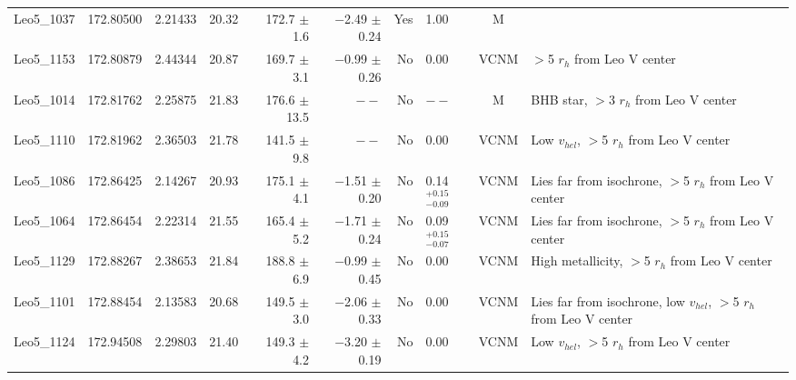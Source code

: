 \begin{table*}[t]
\begin{tabular}{lllrrrrlcl}
Leo5\_1037 & 172.80500 & 2.21433 & 20.32 & 172.7  $\pm$ 1.6 & $-$2.49  $\pm$ 0.24 & Yes & 1.00 & M & \\ 
Leo5\_1153 & 172.80879 & 2.44344 & 20.87 & 169.7  $\pm$ 3.1 & $-$0.99  $\pm$ 0.26 & No & 0.00 & VCNM & $>$5 $r_h$ from Leo V center\\ 
Leo5\_1014 & 172.81762 & 2.25875 & 21.83 & 176.6  $\pm$ 13.5 & $--$ & No &  $--$  & M & BHB star, $>$3 $r_h$ from Leo V center\\ 
Leo5\_1110 & 172.81962 & 2.36503 & 21.78 & 141.5  $\pm$ 9.8 & $--$ & No & 0.00 & VCNM & Low $v_{hel}$, $>$5 $r_h$ from Leo V center\\ 
Leo5\_1086 & 172.86425 & 2.14267 & 20.93 & 175.1  $\pm$ 4.1 & $-$1.51  $\pm$ 0.20 & No & 0.14$^{+0.15}_{-0.09}$ & VCNM & Lies far from isochrone, $>$5 $r_h$ from Leo V center\\ 
Leo5\_1064 & 172.86454 & 2.22314 & 21.55 & 165.4  $\pm$ 5.2 & $-$1.71  $\pm$ 0.24 & No & 0.09$^{+0.15}_{-0.07}$ & VCNM & Lies far from isochrone, $>$5 $r_h$ from Leo V center\\ 
Leo5\_1129 & 172.88267 & 2.38653 & 21.84 & 188.8  $\pm$ 6.9 & $-$0.99  $\pm$ 0.45 & No & 0.00 & VCNM & High metallicity, $>$5 $r_h$ from Leo V center\\ 
Leo5\_1101 & 172.88454 & 2.13583 & 20.68 & 149.5  $\pm$ 3.0 & $-$2.06  $\pm$ 0.33 & No & 0.00 & VCNM & Lies far from isochrone, low $v_{hel}$, $>$5 $r_h$ from Leo V center\\ 
Leo5\_1124 & 172.94508 & 2.29803 & 21.40 & 149.3  $\pm$ 4.2 & $-$3.20  $\pm$ 0.19 & No & 0.00 & VCNM & Low $v_{hel}$, $>$5 $r_h$ from Leo V center\\ 
\hline
\end{tabular}
\end{table*}